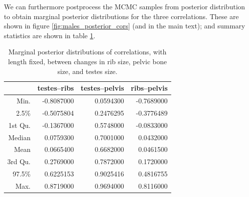 \documentclass[12pt]{article}
\begin{document}
We can furthermore postprocess the MCMC samples from posterior distribution
to obtain marginal posterior distributions for the three correlations.
These are shown in figure \ref{fig:males_posterior_cors} (and in the main text);
and summary statistics are shown in table \ref{tab:posterior_cors}.




\begin{table}[ht]
\centering
\begin{tabular}{rrrr}
  \hline
        &  testes--ribs & testes--pelvis & ribs--pelvis \\
  \hline
 Min. &     -0.8087000  &   0.0594300 & -0.7689000   \\
 2.5\% &    -0.5075804  &   0.2476295 & -0.3776489   \\
 1st Qu. &  -0.1367000  &   0.5748000 & -0.0833000   \\
 Median &    0.0759300  &   0.7001000 &  0.0432000   \\
 Mean &      0.0665400  &   0.6682000 &  0.0461500   \\
 3rd Qu. &   0.2769000  &   0.7872000 &  0.1720000   \\
 97.5\%  &   0.6225153  &   0.9025416 &  0.4816755   \\
 Max. &      0.8719000  &   0.9694000 &  0.8116000   \\
   \hline
\end{tabular}
  \caption{Marginal posterior distributions of correlations, with length fixed,
  between changes in rib size, pelvic bone size, and testes size.
  \label{tab:posterior_cors}
}
\end{table}
\end{document}
